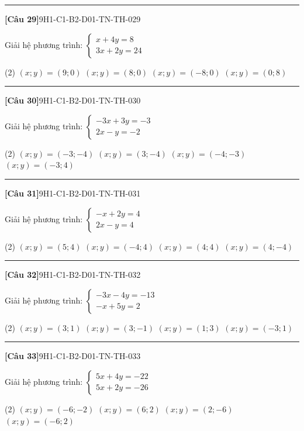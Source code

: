 \documentclass[12pt,a4paper]{article}
\newif\ifloigiai
\newenvironment{cauhoi}[2]{%
  \par\medskip\noindent\rule{\textwidth}{0.4pt}\par\nopagebreak
  \noindent\textbf{[#1]}\hfill{\scriptsize\ttfamily #2}\par\nopagebreak\smallskip}{\par}
\newcommand{\dapan}[1]{\ifloigiai\par\smallskip\noindent\textit{Đáp án:} \textbf{#1}\par\fi}
\begin{document}
\begin{cauhoi}{Câu 29}{9H1-C1-B2-D01-TN-TH-029}
Giải hệ phương trình: $\begin{cases}x + 4y=8\\ 3x + 2y=24\end{cases}$
\begin{tasks}(2)
\task $(x;y)=(9;0)$
\task $(x;y)=(8;0)$
\task $(x;y)=(-8;0)$
\task $(x;y)=(0;8)$
\end{tasks}
\dapan{B}
\end{cauhoi}
\begin{cauhoi}{Câu 30}{9H1-C1-B2-D01-TN-TH-030}
Giải hệ phương trình: $\begin{cases}-3x + 3y=-3\\ 2x - y=-2\end{cases}$
\begin{tasks}(2)
\task $(x;y)=(-3;-4)$
\task $(x;y)=(3;-4)$
\task $(x;y)=(-4;-3)$
\task $(x;y)=(-3;4)$
\end{tasks}
\dapan{A}
\end{cauhoi}
\begin{cauhoi}{Câu 31}{9H1-C1-B2-D01-TN-TH-031}
Giải hệ phương trình: $\begin{cases}-x + 2y=4\\ 2x - y=4\end{cases}$
\begin{tasks}(2)
\task $(x;y)=(5;4)$
\task $(x;y)=(-4;4)$
\task $(x;y)=(4;4)$
\task $(x;y)=(4;-4)$
\end{tasks}
\dapan{C}
\end{cauhoi}
\begin{cauhoi}{Câu 32}{9H1-C1-B2-D01-TN-TH-032}
Giải hệ phương trình: $\begin{cases}-3x - 4y=-13\\ -x + 5y=2\end{cases}$
\begin{tasks}(2)
\task $(x;y)=(3;1)$
\task $(x;y)=(3;-1)$
\task $(x;y)=(1;3)$
\task $(x;y)=(-3;1)$
\end{tasks}
\dapan{A}
\end{cauhoi}
\begin{cauhoi}{Câu 33}{9H1-C1-B2-D01-TN-TH-033}
Giải hệ phương trình: $\begin{cases}5x + 4y=-22\\ 5x + 2y=-26\end{cases}$
\begin{tasks}(2)
\task $(x;y)=(-6;-2)$
\task $(x;y)=(6;2)$
\task $(x;y)=(2;-6)$
\task $(x;y)=(-6;2)$
\end{tasks}
\dapan{D}
\end{cauhoi}
\end{document}
